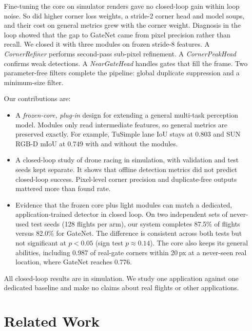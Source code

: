 \documentclass[10pt,twocolumn,letterpaper]{article}
\begin{document}
Fine-tuning the core on simulator renders gave no closed-loop gain within loop noise. So did higher corner loss weights, a stride-2 corner head and model soups, and their cost on general metrics grew with the corner weight. Diagnosis in the loop showed that the gap to GateNet came from pixel precision rather than recall. We closed it with three modules on frozen stride-8 features. A \emph{CornerRefiner} performs second-pass sub-pixel refinement. A \emph{CornerPeakHead} confirms weak detections. A \emph{NearGateHead} handles gates that fill the frame. Two parameter-free filters complete the pipeline: global duplicate suppression and a minimum-size filter.

Our contributions are:
\begin{itemize}
    \item A \emph{frozen-core, plug-in} design for extending a general multi-task perception model. Modules only read intermediate features, so general metrics are preserved exactly. For example, TuSimple lane IoU stays at 0.803 and SUN RGB-D mIoU at 0.749 with and without the modules.
    \item A closed-loop study of drone racing in simulation, with validation and test seeds kept separate. It shows that offline detection metrics did not predict closed-loop success. Pixel-level corner precision and duplicate-free outputs mattered more than found rate.
    \item Evidence that the frozen core plus light modules can match a dedicated, application-trained detector in closed loop. On two independent sets of never-used test seeds (128 flights per arm), our system completes 87.5\% of flights versus 82.0\% for GateNet. The difference is consistent across both tests but not significant at $p<0.05$ (sign test $p\approx0.14$). The core also keeps its general abilities, including 0.987 of real-gate corners within 20\,px at a never-seen real location, where GateNet reaches 0.776.
\end{itemize}
All closed-loop results are in simulation. We study one application against one dedicated baseline and make no claims about real flights or other applications.

\section{Related Work}
\label{sec:related_work}
\end{document}
